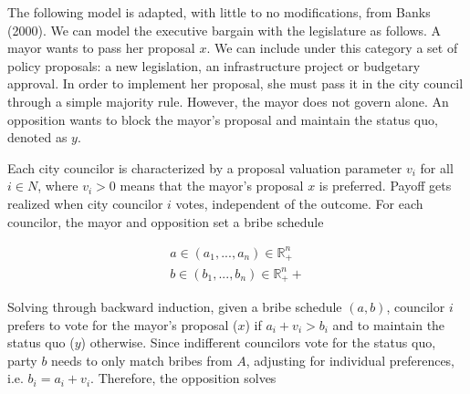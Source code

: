 \documentclass[12pt,a4paper]{article}
\newcommand{\real}{\mathbb{R}_+^n}
\begin{document}
The following model is adapted, with little to no modifications, from Banks (2000). We can model the executive bargain with the legislature as follows. A mayor wants to pass her proposal $x$. We can include under this category a set of policy proposals: a new legislation, an infrastructure project or budgetary approval. In order to implement her proposal, she must pass it in the city council through a simple majority rule. However, the mayor does not govern alone. An opposition wants to block the mayor's proposal and maintain the status quo, denoted as $y$. 

Each city councilor is characterized by a proposal valuation parameter $v_i$ for all $i \in N$, where $v_i > 0$ means that the mayor's proposal $x$ is preferred. Payoff gets realized when city councilor $i$ votes, independent of the outcome. For each councilor, the mayor and opposition set a bribe schedule

\begin{align*}
    a \in (a_1, ..., a_n) \in \real\\
    b \in (b_1, ..., b_n) \in \real+
\end{align*}

Solving through backward induction, given a bribe schedule $(a, b)$, councilor $i$ prefers to vote for the mayor's proposal ($x$) if $a_i + v_i > b_i$ and to maintain the status quo ($y$) otherwise. Since indifferent councilors vote for the status quo, party $b$ needs to only match bribes from $A$, adjusting for individual preferences, i.e. $b_i = a_i + v_i$. Therefore, the opposition solves
\end{document}
